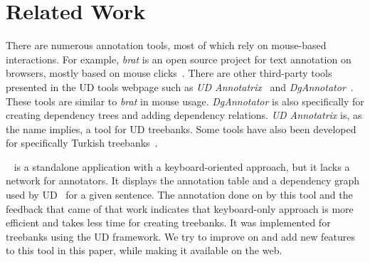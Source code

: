 \section{Related Work}
\label{sec:related}

There are numerous annotation tools, most of which rely on mouse-based interactions.
For example, \textit{brat} is an open source project for text annotation on browsers, mostly based on mouse clicks~\cite{brat,UD}.
There are other third-party tools presented in the UD tools webpage such as \textit{UD Annotatrix}~\cite{tyers-etal:2018} and \textit{DgAnnotator}~\cite{dgannotator}.
These tools are similar to \textit{brat} in mouse usage.
\textit{DgAnnotator} is also specifically for creating dependency trees and adding dependency relations.
\textit{UD Annotatrix} is, as the name implies, a tool for UD treebanks.
Some tools have also been developed for specifically Turkish treebanks~\cite{turk-etal-2019-turkish}.

\boatvone~\cite{turk-etal-2019-turkish} is a standalone application with a keyboard-oriented approach, but it lacks a network for annotators.
It displays the annotation table and a dependency graph used by UD~\cite{UD} for a given sentence.
The annotation done on \bountreebank{} by this tool and the feedback that came of that work indicates that keyboard-only approach is more efficient and takes less time for creating treebanks.
It was implemented for treebanks using the UD framework.
We try to improve on and add new features to this tool in this paper, while making it available on the web.
